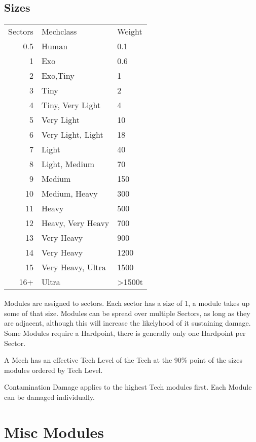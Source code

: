 
\subsection{Sizes}\label{subsec:sizes}

\begin{tabular}{r|ll}
    Sectors & Mechclass & Weight\\
    0.5 &Human & 0.1\\
    1 &Exo& 0.6\\
    2 &Exo,Tiny& 1\\
    3 &Tiny & 2\\
    4 &Tiny, Very Light & 4\\
    5 &Very Light& 10\\
    6 &Very Light, Light& 18\\
    7 &Light& 40\\
    8 &Light, Medium& 70\\
    9 &Medium& 150\\
    10 &Medium, Heavy& 300\\
    11 &Heavy& 500\\
    12 &Heavy, Very Heavy& 700\\
    13 &Very Heavy& 900\\
    14 &Very Heavy& 1200\\
    15 &Very Heavy, Ultra& 1500\\
    16+ &Ultra& >1500t\\
\end{tabular}\par
Modules are assigned to sectors.
Each sector has a size of 1, a module takes up some of that size.
Modules can be spread over multiple Sectors, as long as they are adjacent, although this will increase the likelyhood
of it sustaining damage.
Some Modules require a Hardpoint, there is generally only one Hardpoint per Sector.\par
A Mech has an effective Tech Level of the Tech at the 90\% point of the sizes modules ordered by Tech Level.\par
Contamination Damage applies to the highest Tech modules first.
Each Module can be damaged individually.\par



\section{Misc Modules}\label{sec:miscmodules}
\par
